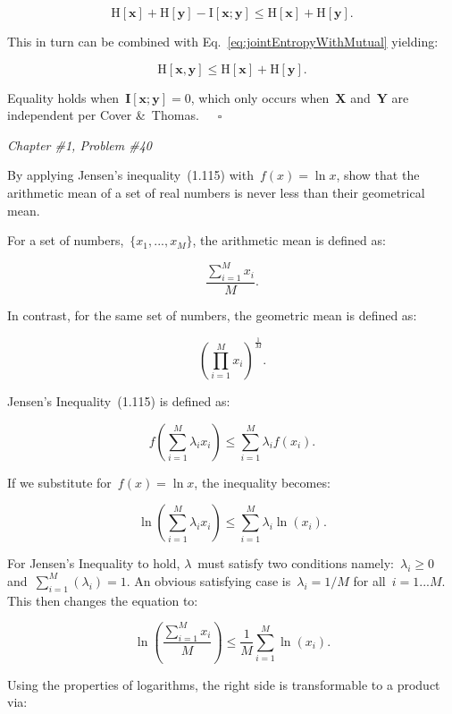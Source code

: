 \documentclass{report}
\newcounter{subProbCount}       %
\newenvironment{problemshell}{
  \par%
  \medskip
  \leftskip=0pt\rightskip=0pt%
}
{
  \par\medskip
  \setcounter{subProbCount}{1} %
}
\newenvironment{problem}[2]
{%
  \begin{problemshell}
    \noindent \textit{Chapter \##1, Problem \##2} \\
    \bfseries  
}
{
  \end{problemshell}
}
\begin{document}
  \[ \textrm{H}[\mathbf{x}] + \textrm{H}[\mathbf{y}] - \textrm{I}[\mathbf{x};\mathbf{y}] \leq \textrm{H}[\mathbf{x}] + \textrm{H}[\mathbf{y}] \textrm{.} \]
  
  This in turn can be combined with Eq.~\eqref{eq:jointEntropyWithMutual} yielding:
  
  \begin{equation}
    \textrm{H}[\mathbf{x},\mathbf{y}] \leq \textrm{H}[\mathbf{x}] + \textrm{H}[\mathbf{y}] \textrm{.}
  \end{equation}
  
  Equality holds when~$\mathbf{I}[\mathbf{x};\mathbf{y}]=0$, which only occurs when~$\mathbf{X}$ and~$\mathbf{Y}$ are independent per Cover \&~Thomas.~~~$\square$
  
  \newpage
  \begin{problem}{1}{40}
     By applying Jensen's inequality~(1.115) with~$f(x)=\ln x$, show that the arithmetic mean of a set of real numbers is never less than their geometrical mean.
  \end{problem}
  
  For a set of numbers,~$\{x_1,...,x_M\}$, the arithmetic mean is defined as:
  
  \[ \frac{\sum_{i=1}^{M}x_i}{M} \textrm{.} \]
  
  In contrast, for the same set of numbers, the geometric mean is defined as:
  
  \[ \left( \prod_{i=1}^{M}x_i \right)^\frac{1}{M}\textrm{.} \]
  
  Jensen's Inequality~(1.115) is defined as:
  
  \[ f \left( \sum_{i=1}^M{\lambda_{i} x_i} \right) \leq \sum_{i=1}^M{\lambda_{i} f(x_i)}\textrm{.}\]
  
  If we substitute for~$f(x)=\ln x$, the inequality becomes:

  \[ \ln \left( \sum_{i=1}^M{\lambda_{i} x_i} \right) \leq \sum_{i=1}^M{\lambda_{i} \ln(x_i)}\textrm{.} \]
  
  For Jensen's Inequality to hold, $\lambda$~must satisfy two conditions namely:~$\lambda_i \geq 0$ and~$\sum_{i=1}^{M}\left( \lambda_i \right) = 1$.  An obvious satisfying case is~$\lambda_i=1/M$ for all~$i=1...M$.  This then changes the equation to:
  
  \[ \ln \left( \frac{\sum_{i=1}^{M}{x_i}}{M} \right) \leq \frac{1}{M}\sum_{i=1}^M{\ln(x_i)}\textrm{.} \]
  
  Using the properties of logarithms, the right side is transformable to a product via:
  
\end{document}
